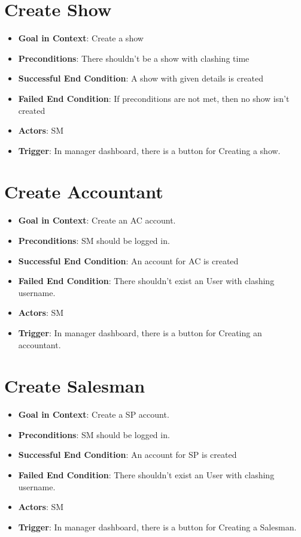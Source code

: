 \documentclass{scrreprt}
\begin{document}
\section{Create Show}
\begin{itemize}
\item \textbf{Goal in Context}: Create a show
\item \textbf{Preconditions}: There shouldn't be a show with clashing time
\item \textbf{Successful End Condition}: A show with given details is created
\item \textbf{Failed End Condition}: If preconditions are not met, then no show isn't created
\item \textbf{Actors}: SM
\item \textbf{Trigger}: In manager dashboard, there is a button for Creating a show.
\end{itemize}

\section{Create Accountant}
\begin{itemize}
\item \textbf{Goal in Context}: Create an AC account.
\item \textbf{Preconditions}: SM should be logged in.
\item \textbf{Successful End Condition}: An account for AC is created
\item \textbf{Failed End Condition}: There shouldn't exist an User with clashing username.
\item \textbf{Actors}: SM
\item \textbf{Trigger}: In manager dashboard, there is a button for Creating an accountant.
\end{itemize}

\section{Create Salesman}
\begin{itemize}
\item \textbf{Goal in Context}: Create a SP account.
\item \textbf{Preconditions}: SM should be logged in.
\item \textbf{Successful End Condition}: An account for SP is created
\item \textbf{Failed End Condition}: There shouldn't exist an User with clashing username.
\item \textbf{Actors}: SM
\item \textbf{Trigger}: In manager dashboard, there is a button for Creating a Salesman.
\end{itemize}
\end{document}
